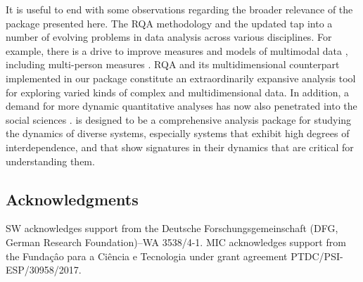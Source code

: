 It is useful to end with some observations regarding the broader relevance of the package presented here. The RQA methodology and the updated  tap into a number of evolving problems in data analysis across various disciplines. For example, there is a drive to improve measures and models of multimodal data \citep{abawajy2015comprehensive,dale2015integrative,lahat2015multimodal}, including multi-person measures  \citep{cooke2013interactive,lopez2017combining,schilbach2013toward,von2016verbal,wallot2016beyond}. RQA and its multidimensional counterpart implemented in our package constitute an extraordinarily expansive analysis tool for exploring varied kinds of complex and multidimensional data. In addition, a demand for more dynamic quantitative analyses has now also penetrated into the social sciences \citep{chemero2011radical,friedenberg2009dynamical,spivey2008continuity,ward2002dynamical, pagnotta2020attentional}. \textbf{} is designed to be a comprehensive analysis package for studying the dynamics of diverse systems, especially systems that exhibit high degrees of interdependence, and that show signatures in their dynamics that are critical for understanding them. 

\subsection{Acknowledgments}

SW acknowledges support from the Deutsche Forschungsgemeinschaft (DFG, German Research Foundation)--WA 3538/4-1. MIC acknowledges support from the Funda\c{c}\^ao para a Ci\^encia e Tecnologia under grant agreement PTDC/PSI-ESP/30958/2017. 

\newpage



\newpage

\address{Moreno I. Coco\\
    School of Psychology\\
    University of East London\\
    E154LZ, London, UK\\
    E-mail: \\
    }

\address{Dan M{\o}nster\\
  School of Business and Social Sciences\\
  Aarhus University\\
  DK-8210, Aarhus V, Denmark\\
  ORCiD: 0000-0001-9639-8823\\
  E-mail: \\
  }

